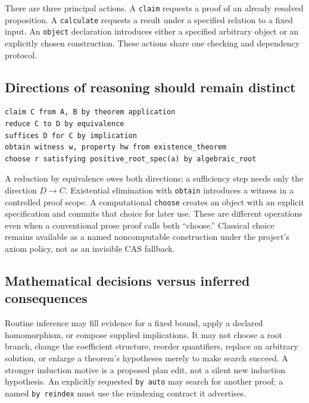 \documentclass[11pt,letterpaper]{article}
\newcommand{\code}[1]{\nolinkurl{#1}}
\numberwithin{equation}{section}
\begin{document}
There are three principal actions. A \code{claim} requests a proof of an already
resolved proposition. A \code{calculate} requests a result under a specified
relation to a fixed input. An \code{object} declaration introduces either a
specified arbitrary object or an explicitly chosen construction. These actions
share one checking and dependency protocol.

\subsection{Directions of reasoning should remain distinct}
\par\noindent\begin{minipage}{\linewidth}
\begin{lstlisting}
claim C from A, B by theorem application
reduce C to D by equivalence
suffices D for C by implication
obtain witness w, property hw from existence_theorem
choose r satisfying positive_root_spec(a) by algebraic_root
\end{lstlisting}
\end{minipage}\par


A reduction by equivalence owes both directions; a sufficiency step needs only
the direction $D\to C$. Existential elimination with \code{obtain} introduces a
witness in a controlled proof scope. A computational \code{choose} creates an
object with an explicit specification and commits that choice for later use.
These are different operations even when a conventional prose proof calls both
``choose.'' Classical choice remains available as a named noncomputable
construction under the project's axiom policy, not as an invisible CAS fallback.

\subsection{Mathematical decisions versus inferred consequences}
Routine inference may fill evidence for a fixed bound, apply a declared
homomorphism, or compose supplied implications. It may not choose a root branch,
change the coefficient structure, reorder quantifiers, replace an arbitrary
solution, or enlarge a theorem's hypotheses merely to make search succeed.
A stronger induction motive is a proposed plan edit, not a silent new induction
hypothesis. An explicitly requested \code{by auto} may search for another proof;
a named \code{by reindex} must use the reindexing contract it advertises.
\end{document}
